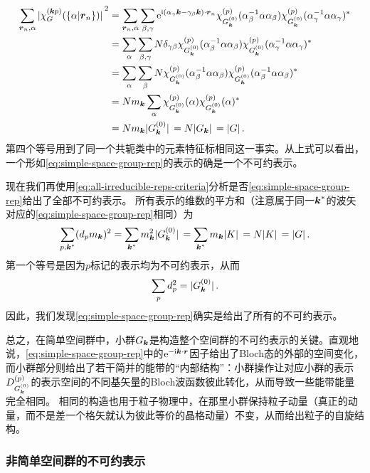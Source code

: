 \[
    \begin{aligned}
        \sum_{\vb*{r}_n, \alpha} \abs*{\chi^{(\vb*{k} p)}_G(\{\alpha|\vb*{r}_n\})}^2 &= 
        \sum_{\vb*{r}_n, \alpha} \sum_{\beta, \gamma} \mathrm{e}^{\mathrm{i} (\alpha_\gamma \vb*{k} - \gamma_\beta \vb*{k}) \cdot \vb*{r}_n} \chi^{(p)}_{G^{(0)}_{\vb*{k}}} (\alpha^{-1}_\beta \alpha \alpha_\beta) \chi^{(p)}_{G^{(0)}_{\vb*{k}}} (\alpha^{-1}_\gamma \alpha \alpha_\gamma)^* \\
        &= \sum_\alpha \sum_{\beta, \gamma} N \delta_{\gamma \beta} \chi^{(p)}_{G^{(0)}_{\vb*{k}}} (\alpha^{-1}_\beta \alpha \alpha_\beta) \chi^{(p)}_{G^{(0)}_{\vb*{k}}} (\alpha^{-1}_\gamma \alpha \alpha_\gamma)^* \\
        &= \sum_\alpha \sum_{\beta} N \chi^{(p)}_{G^{(0)}_{\vb*{k}}} (\alpha^{-1}_\beta \alpha \alpha_\beta) \chi^{(p)}_{G^{(0)}_{\vb*{k}}} (\alpha^{-1}_\beta \alpha \alpha_\beta)^* \\
        &= N m_{\vb*{k}} \sum_\alpha \chi^{(p)}_{G^{(0)}_{\vb*{k}}} (\alpha) \chi^{(p)}_{G^{(0)}_{\vb*{k}}} (\alpha)^* \\
        &= N m_{\vb*{k}} \abs*{G_{\vb*{k}}^{(0)}} = N \abs*{G_{\vb*{k}}} = \abs*{G}.
    \end{aligned}
\]
第四个等号用到了同一个共轭类中的元素特征标相同这一事实。从上式可以看出，一个形如\eqref{eq:simple-space-group-rep}的表示的确是一个不可约表示。

现在我们再使用\eqref{eq:all-irreducible-reps-criteria}分析是否\eqref{eq:simple-space-group-rep}给出了全部不可约表示。
所有表示的维数的平方和（注意属于同一$\vb*{k}^*$的波矢对应的\eqref{eq:simple-space-group-rep}相同）为
\[
    \sum_{p, \vb*{k}^*} (d_p m_{\vb*{k}})^2 = \sum_{\vb*{k}^*} m_{\vb*{k}}^2 \abs*{G_{\vb*{k}}^{(0)}} = \sum_{\vb*{k}^*} m_{\vb*{k}} \abs*{K} = N \abs*{K} = \abs*{G}.
\]
第一个等号是因为$p$标记的表示均为不可约表示，从而
\[
    \sum_p d_p^2 = \abs*{G_{\vb*{k}}^{(0)}}.
\]
因此，我们发现\eqref{eq:simple-space-group-rep}确实是给出了所有的不可约表示。

总之，在简单空间群中，小群$G_{\vb*{k}}$是构造整个空间群的不可约表示的关键。直观地说，\eqref{eq:simple-space-group-rep}中的$\mathrm{e}^{- \mathrm{i} \vb*{k} \cdot \vb*{r}}$因子给出了Bloch态的外部的空间变化，而小群部分则给出了若干简并的能带的“内部结构”：小群操作让对应小群的表示$D^{(p)}_{G^{(0)}_{\vb*{k}}}$的表示空间的不同基矢量的Bloch波函数彼此转化，从而导致一些能带能量完全相同。
相同的构造也用于粒子物理中，在那里小群保持粒子动量（真正的动量，而不是差一个格矢就认为彼此等价的晶格动量）不变，从而给出粒子的自旋结构。

\subsubsection{非简单空间群的不可约表示}

